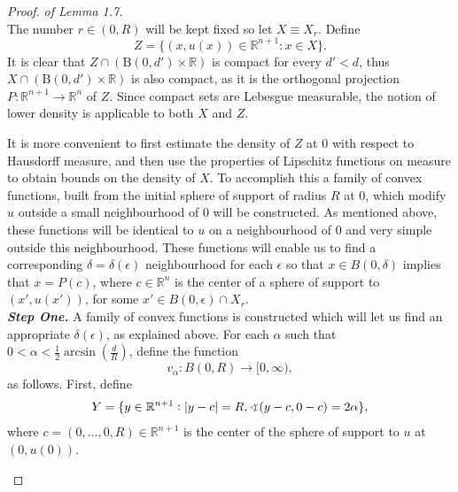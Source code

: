 \documentclass[10pt]{article}
\begin{document}
\begin{proof} \textit{of Lemma 1.7.}\\
The number $r \in (0,R)$ will be kept fixed so let $X \equiv X_{r}$. Define $$Z= \{(x,u(x))\in \mathbb{R}^{n+1}:x\in X\}.$$ It is clear that $Z\cap(\text{\={B}}(0,d')\times\mathbb{R})$ is compact for every $d'<d$, thus $X\cap(\text{\={B}}(0,d')\times\mathbb{R})$ is also compact, as it is the orthogonal projection $P:\mathbb{R}^{n+1}\rightarrow \mathbb{R}^{n}$ of $Z$. Since compact sets are Lebesgue measurable, the notion of lower density is applicable to both $X$ and $Z$.

It is more convenient to first estimate the density of $Z$ at 0 with respect to Hausdorff measure, and then use the properties of Lipschitz functions on measure to obtain bounds on the density of $X$. To accomplish this a family of convex functions, built from the initial sphere of support of radius $R$ at 0, which modify $u$ outside a small neighbourhood of 0 will be constructed. As mentioned above, these functions will be identical to $u$ on a neighbourhood of $0$ and very simple outside this neighbourhood. These functions will enable us to find a corresponding $\delta=\delta(\epsilon) $ neighbourhood for each $\epsilon$ so that $x\in B(0,\delta)$ implies that $x=P(c)$, where $c\in \mathbb{R}^n$ is the center of a sphere of support to $(x',u(x'))$, for some $x'\in B(0,\epsilon) \cap X_r$.\\
\textbf{\textit{Step One.}} A family of convex functions is constructed which will let us find an appropriate $\delta(\epsilon)$, as explained above. For each $\alpha$ such that $0<\alpha<\frac{1}{2}\arcsin (\frac{d}{R})$, define the function 
$$
v_{\alpha}:B(0,R)\rightarrow[0,\infty),
$$
as follows. First, define
\begin{align}
Y=\{y\in \mathbb{R}^{n+1}:|y-c|=R, \varangle (y-c, 0-c)=2\alpha\},
\end{align} where $c=(0,...,0,R)\in \mathbb{R}^{n+1}$ is the center of the sphere of support to $u$ at $(0,u(0))$.
\begin{figure}[!h]
\centering
{}
\end{figure}
\end{proof}
\end{document}
